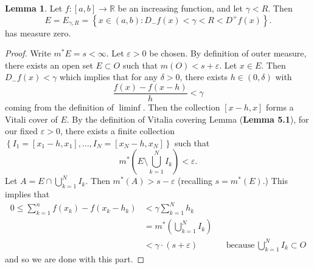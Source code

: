 \documentclass[12pt]{article}
\newcommand{\R}{\mathbb{R}}
\renewcommand{\epsilon}{\varepsilon}
\theoremstyle{definition}
\newtheorem*{lemma}{Lemma}
\begin{document}
\begin{lemma}
    Let \( f: [a,b] \to \R \) be an increasing function, and let \( \gamma < R \). Then 
        \[
            E = E_{\gamma, R} = \left\{ x \in (a,b): D_{-}f(x) < \gamma < R < D^{+}f(x)\right\}.
        \]
    has measure zero.

    \begin{proof}
        Write \( m^* E = s < \infty \). Let \( \epsilon > 0 \) be chosen. By definition of outer measure, there exists
        an open set \( E \subset O \) such that \( m(O) < s + \epsilon \). Let \( x \in E \). 
        Then \( \displaystyle D_{-}f(x) < \gamma \) which implies that for any \( \delta > 0 \), there exists \( h \in (0, \delta) \) with 
            \[  
                \frac{f(x) - f(x - h)}{h} < \gamma 
            \]
        coming from the definition of \( \liminf \). 
        Then the collection \( [x - h, x] \) forms a Vitali cover of \( E \). 
        By the definition of Vitalia covering Lemma (\textbf{Lemma 5.1}), for our fixed \( \epsilon > 0 \),
        there exists a finite collection \( \left\{ I_1 = [x_1 - h, x_1 ],  \ldots, I_N = [x_N - h, x_N] \right\} \) such that
            \[
                m^{*} \left( E \setminus \bigcup_{k=1}^{N} I_k \right) < \epsilon.  
            \]
        Let \( \displaystyle A = E \cap \bigcup_{k=1}^{N} I_k \). Then \( m^{*}(A) > s - \epsilon \) (recalling \( s = m^{*}(E) \).)
        This implies that 
            \begin{align*}
                0 \leq \sum_{k=1}^{n} f(x_k) - f(x_k - h_k) &< \gamma \sum_{k=1}^{N} h_k \\
                &= m^{*}\left( \bigcup_{k=1}^{N} I_k \right) \\
                &< \gamma \cdot (s + \epsilon) && \text{because} \ \bigcup_{k=1}^{N} I_k \subset O
            \end{align*}
        and so we are done with this part.


\end{proof}
\end{lemma}
\end{document}
